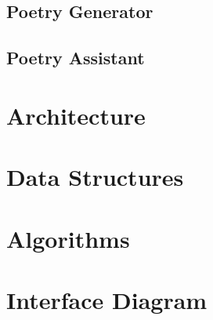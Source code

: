 \documentclass[10pt, letter,twocolumn]{IEEEtran}
\begin{document}
\subsection*{Poetry Generator}

\subsection*{Poetry Assistant}

\section{Architecture}
\section{Data Structures}
\section{Algorithms}
\section{Interface Diagram}



\end{document}
